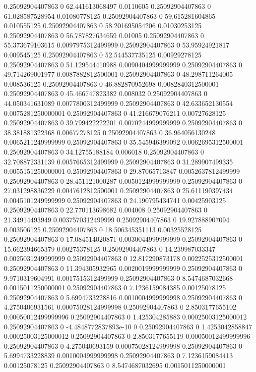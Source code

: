 0.25092904407863 0 62.441613068497 0.0110605
0.25092904407863 0 61.028587528954 0.01080778125
0.25092904407863 0 59.615281604865 0.010555125
0.25092904407863 0 58.201695054206 0.01030253125
0.25092904407863 0 56.787827634659 0.01005
0.25092904407863 0 55.373679103615 0.0097975312499999
0.25092904407863 0 53.95924921817 0.009545125
0.25092904407863 0 52.544537735125 0.00929278125
0.25092904407863 0 51.129544410988 0.0090404999999999
0.25092904407863 0 49.714269001977 0.0087882812500001
0.25092904407863 0 48.298711264005 0.008536125
0.25092904407863 0 46.882870952698 0.0082840312500001
0.25092904407863 0 45.466747823382 0.008032
0.25092904407863 0 44.050341631089 0.0077800312499999
0.25092904407863 0 42.633652130554 0.0075281250000001
0.25092904407863 0 41.216679076211 0.00727628125
0.25092904407863 0 39.799422222201 0.0070244999999999
0.25092904407863 0 38.381881322368 0.00677278125
0.25092904407863 0 36.964056130248 0.0065211249999999
0.25092904407863 0 35.545946399092 0.0062695312500001
0.25092904407863 0 34.12755188184 0.006018
0.25092904407863 0 32.708872331139 0.0057665312499999
0.25092904407863 0 31.289907499335 0.0055151250000001
0.25092904407863 0 29.87065713847 0.0052637812499999
0.25092904407863 0 28.451121000287 0.0050124999999999
0.25092904407863 0 27.031298836229 0.0047612812500001
0.25092904407863 0 25.611190397434 0.0045101249999999
0.25092904407863 0 24.190795434741 0.00425903125
0.25092904407863 0 22.770113698682 0.004008
0.25092904407863 0 21.34914493949 0.0037570312499999
0.25092904407863 0 19.927888907094 0.003506125
0.25092904407863 0 18.506345351113 0.00325528125
0.25092904407863 0 17.084514020871 0.0030044999999999
0.25092904407863 0 15.662394665379 0.00275378125
0.25092904407863 0 14.239987033347 0.0025031249999999
0.25092904407863 0 12.817290873178 0.0022525312500001
0.25092904407863 0 11.394305932965 0.0020019999999999
0.25092904407863 0 9.9710319604991 0.0017515312499999
0.25092904407863 0 8.5474687032668 0.0015011250000001
0.25092904407863 0 7.1236159084385 0.00125078125
0.25092904407863 0 5.6994733228816 0.0010004999999998
0.25092904407863 0 4.2750406931561 0.00075028124999998
0.25092904407863 0 2.8503177655102 0.00050012499999996
0.25092904407863 0 1.425304285883 0.00025003125000012
0.25092904407863 0 -4.4848772837893e-10 0
0.25092904407863 0 1.4253042858847 0.00025003125000012
0.25092904407863 0 2.8503177655119 0.00050012499999996
0.25092904407863 0 4.275040693159 0.00075028124999998
0.25092904407863 0 5.6994733228839 0.0010004999999998
0.25092904407863 0 7.1236159084413 0.00125078125
0.25092904407863 0 8.5474687032695 0.0015011250000001
